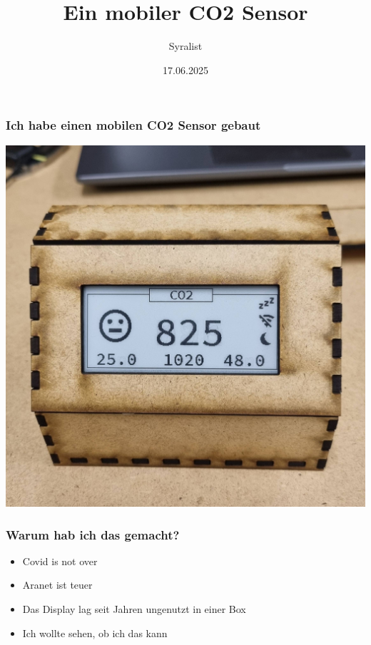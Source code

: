 \documentclass[aspectratio=169,svgnames]{beamer}
\title{Ein mobiler CO2 Sensor}
\author{Syralist}
\date{17.06.2025}
\newcommand{\divider}[1]{\begin{frame} %
\begin{alertblock}{} %
\centering\usebeamerfont{section title}#1 %
\end{alertblock} %
\end{frame}}
\begin{document}
\maketitle

\begin{frame}%
    \frametitle{Ich habe einen mobilen CO2 Sensor gebaut} %
    \centering
    \includegraphics[height=0.9\textheight]{sensor-fertig-01.jpg}
\end{frame}

\begin{frame}%
    \frametitle{Warum hab ich das gemacht?} %
    \begin{itemize}[<+->]
        \item Covid is not over
        \item Aranet ist teuer
        \item Das Display lag seit Jahren ungenutzt in einer Box
        \item Ich wollte sehen, ob ich das kann
    \end{itemize}
\end{frame}
\end{document}
